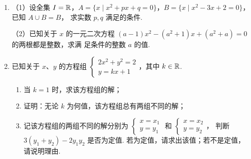 \documentclass[a4paper,11pt]{article}
\begin{document}
\begin{enumerate}
\fi

\ansspace[6]

\item （1）设全集 $I=\mathbb{R}$，$A=\{x\mid x^2+px+q=0\}$，$B=\{x\mid x^2-3x+2=0\}$，已知 $A\cup B=B$，
求实数 $p,q$ 满足的条件.

（2）已知关于 $x$ 的一元二次方程 $(a-1)x^2-(a^2+1)x+(a^2+a)=0$ 的两根都是整数，求满
足条件的整数 $a$ 的值.

\ifanswer
\solbegin
{}
\solend

\fi

\ansspace[8]

\item 已知关于 $x$、$y$ 的方程组 $\begin{cases}2x^2+y^2=2\\ y=kx+1\end{cases}$，其中 $k\in\mathbb{R}$.

\begin{enumerate}[label=(\arabic*)]
\item 当 $k=1$ 时，求该方程组的解；
\item 证明：无论 $k$ 为何值，该方程组总有两组不同的解；
\item 记该方程组的两组不同的解分别为
$\begin{cases}x=x_1\\ y=y_1\end{cases}$ 和 $\begin{cases}x=x_2\\ y=y_2\end{cases}$，
判断 $3(y_1+y_2)-2y_1y_2$ 是否为定值. 若为定值，请求出该值；若不是定值，请说明理由.
\end{enumerate}


\end{enumerate}
\end{document}
